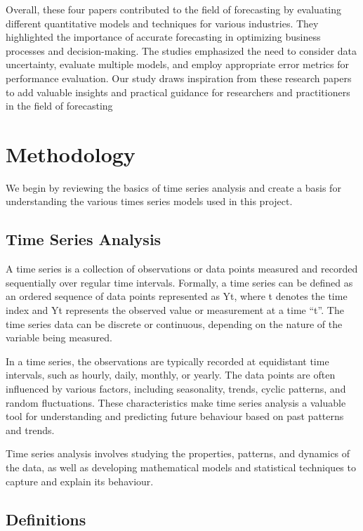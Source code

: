 \documentclass[
]{article}
\begin{document}
Overall, these four papers contributed to the field of forecasting by
evaluating different quantitative models and techniques for various
industries. They highlighted the importance of accurate forecasting in
optimizing business processes and decision-making. The studies
emphasized the need to consider data uncertainty, evaluate multiple
models, and employ appropriate error metrics for performance evaluation.
Our study draws inspiration from these research papers to add valuable
insights and practical guidance for researchers and practitioners in the
field of forecasting

\hypertarget{methodology}{%
\section{Methodology}\label{methodology}}

We begin by reviewing the basics of time series analysis and create a
basis for understanding the various times series models used in this
project.

\hypertarget{time-series-analysis}{%
\subsection{Time Series Analysis}\label{time-series-analysis}}

A time series is a collection of observations or data points measured
and recorded sequentially over regular time intervals. Formally, a time
series can be defined as an ordered sequence of data points represented
as Yt, where t denotes the time index and Yt represents the observed
value or measurement at a time ``t''. The time series data can be
discrete or continuous, depending on the nature of the variable being
measured.

In a time series, the observations are typically recorded at equidistant
time intervals, such as hourly, daily, monthly, or yearly. The data
points are often influenced by various factors, including seasonality,
trends, cyclic patterns, and random fluctuations. These characteristics
make time series analysis a valuable tool for understanding and
predicting future behaviour based on past patterns and trends.

Time series analysis involves studying the properties, patterns, and
dynamics of the data, as well as developing mathematical models and
statistical techniques to capture and explain its behaviour.

\hypertarget{definitions}{%
\subsection{Definitions}\label{definitions}}
\end{document}
